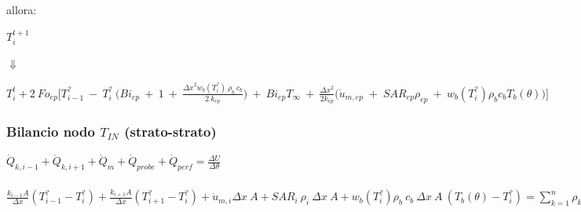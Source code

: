 \vspace{0.3cm}
\noindent
\hspace{2cm} allora:
\vspace{-0.3cm}


\begin{center}
	$T_i ^{t+1}$
	\begin{center}
		\begin{center}
			$\Downarrow$
		\end{center}
	\end{center}
	$T_i ^t + 2 \: Fo_{ep} \Bigg[ T_{i-1}^? \:-\: T_i^? \:\Big(Bi_{ep} \:+\: 1 \:+\:  \frac{{\Delta x}^2 w_b (T_i^?) \: \rho _b \: c_b}{2 \: k_{ep}} \Big) \:+\: Bi_{ep} T_{\infty} \:+\: \frac{{\Delta x}^2}{2 k_{ep}} \Big(\Dot{u}_{m,ep} \;+\; SAR_{ep} \rho_{ep} \:+\:  w_b (T_i^?) \rho _b c_b T_b(\theta)\Big) \Bigg]$
\end{center}

















\newpage
















\subsubsection*{\hspace{1cm} Bilancio nodo $T_{IN}$ (strato-strato)}

\vspace{0.3cm}

\begin{center}
	$ \Dot{Q} _{k, i-1} +\Dot{Q} _{k, i+1}+ \Dot{Q}_{m} +\Dot{Q} _{probe}+ \Dot{Q} _{perf}= \frac{\Delta U}{\Delta \theta} $
\end{center}

\hspace{-0.5cm}
\begin{minipage}\columnwidth
\begin{center}
	$ \frac{k_{i-1}A}{\Delta x}(T_{i-1} ^? - T_i ^? ) + \frac{k_{i+1}A}{\Delta x}(T_{i+1} ^? - T_i ^? ) + \Dot{u} _{m,i}\Delta x \: A + SAR_{i} \: \rho _{i} \: \Delta x \: A  + w_b (T_i^?) \rho _b \: c_b \: \Delta x \: A \: (T_b(\theta)-T_i ^?) = \sum_{k=1}^{n} \rho _{k} \: c_{k} \: s_{k} \: A \: \frac{(T_i ^{t+1} - T_i ^t )}{\Delta \theta}$
\end{center}
\end{minipage}



